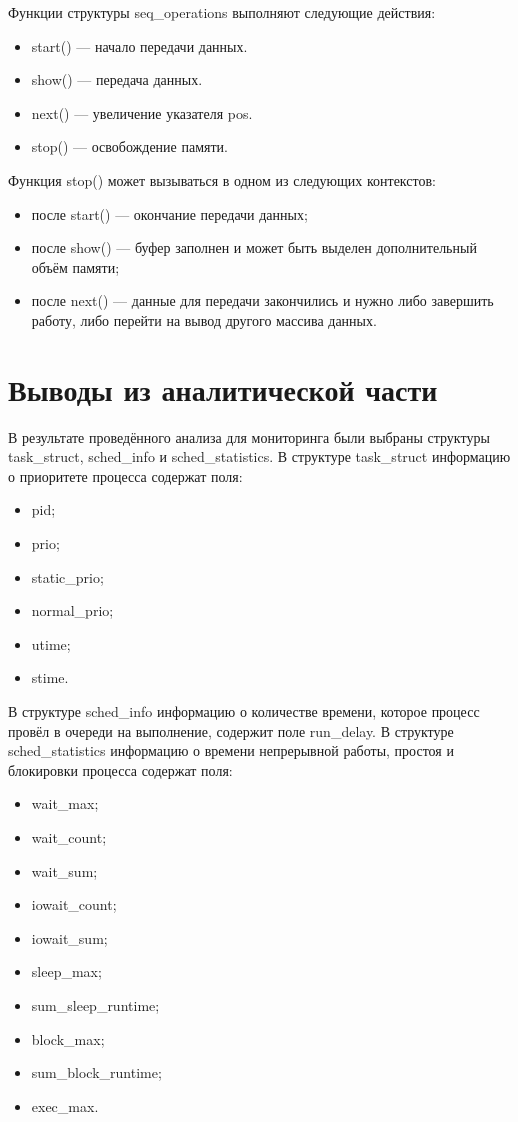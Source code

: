 Функции структуры seq\_operations выполняют следующие действия:

\begin{itemize}[label*=---]
	\item start() --- начало передачи данных.
	\item show() --- передача данных.
	\item next() --- увеличение указателя pos.
	\item stop() --- освобождение памяти.
\end{itemize}

Функция stop() может вызываться в одном из следующих контекстов:

\begin{itemize}[label*=---]
	\item после start() --- окончание передачи данных;
	\item после show() --- буфер заполнен и может быть выделен дополнительный объём памяти;
	\item после next() --- данные для передачи закончились и нужно либо завершить работу, либо перейти на вывод другого массива данных.
\end{itemize}



\section*{Выводы из аналитической части}
В результате проведённого анализа для мониторинга были выбраны структуры task\_struct, sched\_info и sched\_statistics. В структуре task\_struct информацию о приоритете процесса содержат поля:
\begin{itemize}[label*=---]
	\item pid;
	\item prio;
	\item static\_prio;
	\item normal\_prio;
	\item utime;
	\item stime.
\end{itemize} 
В структуре sched\_info информацию о количестве времени, которое процесс провёл в очереди на выполнение, содержит поле run\_delay. В структуре sched\_statistics информацию о времени непрерывной работы, простоя и блокировки процесса содержат поля:
\begin{itemize}[label*=---]
	\item wait\_max;
	\item wait\_count;
	\item wait\_sum;
	\item iowait\_count;
	\item iowait\_sum;
	\item sleep\_max;
	\item sum\_sleep\_runtime;
	\item block\_max;
	\item sum\_block\_runtime;
	\item exec\_max.
\end{itemize}

